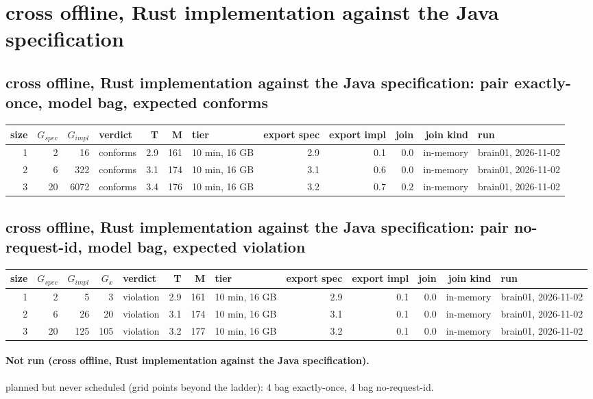 \documentclass[10pt]{article}
\begin{document}
\section*{cross offline, Rust implementation against the Java specification}
\subsection*{cross offline, Rust implementation against the Java specification: pair \textsf{exactly-once}, model bag, expected conforms}
\begin{longtable}{@{}rrrlrrlrrrrl@{}}
\toprule
size & $G_{\mathit{spec}}$ & $G_{\mathit{impl}}$ & verdict & T & M & tier & export spec & export impl & join & join kind & run \\
\midrule
\endhead
\color{red} 1 & 2 & 16 & conforms & 2.9 & 161 & 10 min, 16 GB & 2.9 & 0.1 & 0.0 & in-memory & brain01, 2026-11-02 \\
\color{red} 2 & 6 & 322 & conforms & 3.1 & 174 & 10 min, 16 GB & 3.1 & 0.6 & 0.0 & in-memory & brain01, 2026-11-02 \\
\color{red} 3 & 20 & 6072 & conforms & 3.4 & 176 & 10 min, 16 GB & 3.2 & 0.7 & 0.2 & in-memory & brain01, 2026-11-02 \\
\bottomrule
\end{longtable}
\subsection*{cross offline, Rust implementation against the Java specification: pair \textsf{no-request-id}, model bag, expected violation}
\begin{longtable}{@{}rrrrlrrlrrrrl@{}}
\toprule
size & $G_{\mathit{spec}}$ & $G_{\mathit{impl}}$ & $G_x$ & verdict & T & M & tier & export spec & export impl & join & join kind & run \\
\midrule
\endhead
\color{red} 1 & 2 & 5 & 3 & violation & 2.9 & 161 & 10 min, 16 GB & 2.9 & 0.1 & 0.0 & in-memory & brain01, 2026-11-02 \\
\color{red} 2 & 6 & 26 & 20 & violation & 3.1 & 174 & 10 min, 16 GB & 3.1 & 0.1 & 0.0 & in-memory & brain01, 2026-11-02 \\
\color{red} 3 & 20 & 125 & 105 & violation & 3.2 & 177 & 10 min, 16 GB & 3.2 & 0.1 & 0.0 & in-memory & brain01, 2026-11-02 \\
\bottomrule
\end{longtable}
\paragraph{Not run (cross offline, Rust implementation against the Java specification).}
planned but never scheduled (grid points beyond the ladder): 4 bag exactly-once, 4 bag no-request-id.\par
\end{document}
